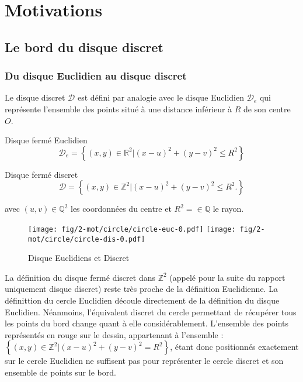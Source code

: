 \section{Motivations}

\subsection{Le bord du disque discret}

\subsubsection{Du disque Euclidien au disque discret}


Le disque discret $\mathcal{D}$ est défini par analogie avec le disque Euclidien $\mathcal{D}_e$ qui représente l'ensemble des points situé à une distance inférieur à $R$ de son centre $O$.


\begin{Definition}{Disque fermé Euclidien}
\label{def:disk-euc}
 $$\mathcal{D}_e =  \left\{ (x,y) \in \mathbb{R}^{2} |  (x - u)^2 + (y - v)^2 \leq R^2 \right\}$$
\end{Definition}

\begin{Definition}{Disque fermé discret}
\label{def:disk-dis}
  $$\mathcal{D} =  \left\{ (x,y) \in \mathbb{Z}^{2} |  (x - u)^2 + (y - v)^2 \leq R^2. \right\}$$
  
  avec $(u,v) \in \mathbb{Q}^{2}$ les coordonnées du centre et $R^2 = \in \mathbb{Q}$ le rayon.\\
\end{Definition}

\begin{figure}[H]
  \centering
  \texttt{[image: fig/2-mot/circle/circle-euc-0.pdf]}
  \texttt{[image: fig/2-mot/circle/circle-dis-0.pdf]}
  \caption{Disque Euclidiens et Discret}
\end{figure}

La définition du disque fermé discret dans $\mathbb{Z}^{2}$ (appelé pour la suite du rapport uniquement disque discret) reste très proche de la définition Euclidienne. La définittion du cercle Euclidien découle directement de la définition du disque Euclidien. Néanmoins, l'équivalent discret du cercle permettant de récupérer tous les points du bord change quant à elle considérablement. L'ensemble des points représentés en rouge sur le dessin, appartenant à l'ensemble : $\left\{ (x,y) \in \mathbb{Z}^{2} |  (x - u)^2 + (y - v)^2 = R^2 \right\}$, étant donc positionnés exactement sur le cercle Euclidien ne suffisent pas pour représenter le cercle discret et son ensemble de points sur le bord. 

